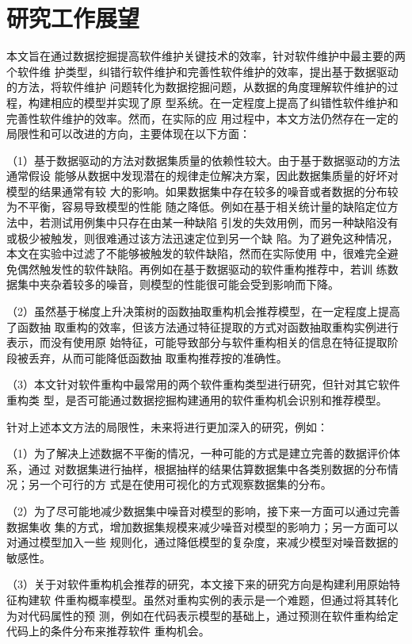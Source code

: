 \section{研究工作展望}
本文旨在通过数据挖掘提高软件维护关键技术的效率，针对软件维护中最主要的两个软件维
护类型，纠错行软件维护和完善性软件维护的效率，提出基于数据驱动的方法，将软件维护
问题转化为数据挖掘问题，从数据的角度理解软件维护的过程，构建相应的模型并实现了原
型系统。在一定程度上提高了纠错性软件维护和完善性软件维护的效率。然而，在实际的应
用过程中，本文方法仍然存在一定的局限性和可以改进的方向，主要体现在以下方面：

（1）基于数据驱动的方法对数据集质量的依赖性较大。由于基于数据驱动的方法通常假设
能够从数据中发现潜在的规律走位解决方案，因此数据集质量的好坏对模型的结果通常有较
大的影响。如果数据集中存在较多的噪音或者数据的分布较为不平衡，容易导致模型的性能
随之降低。例如在基于相关统计量的缺陷定位方法中，若测试用例集中只存在由某一种缺陷
引发的失效用例，而另一种缺陷没有或极少被触发，则很难通过该方法迅速定位到另一个缺
陷。为了避免这种情况，本文在实验中过滤了不能够被触发的软件缺陷，然而在实际使用
中，很难完全避免偶然触发性的软件缺陷。再例如在基于数据驱动的软件重构推荐中，若训
练数据集中夹杂着较多的噪音，则模型的性能很可能会受到影响而下降。


（2）虽然基于梯度上升决策树的函数抽取重构机会推荐模型，在一定程度上提高了函数抽
取重构的效率，但该方法通过特征提取的方式对函数抽取重构实例进行表示，而没有使用原
始特征，可能导致部分与软件重构相关的信息在特征提取阶段被丢弃，从而可能降低函数抽
取重构推荐按的准确性。

（3）本文针对软件重构中最常用的两个软件重构类型进行研究，但针对其它软件重构类
型，是否可能通过数据挖掘构建通用的软件重构机会识别和推荐模型。

针对上述本文方法的局限性，未来将进行更加深入的研究，例如：

（1）为了解决上述数据不平衡的情况，一种可能的方式是建立完善的数据评价体系，通过
对数据集进行抽样，根据抽样的结果估算数据集中各类别数据的分布情况；另一个可行的方
式是在使用可视化的方式观察数据集的分布。

（2）为了尽可能地减少数据集中噪音对模型的影响，接下来一方面可以通过完善数据集收
集的方式，增加数据集规模来减少噪音对模型的影响力；另一方面可以对通过模型加入一些
规则化，通过降低模型的复杂度，来减少模型对噪音数据的敏感性。

（3）关于对软件重构机会推荐的研究，本文接下来的研究方向是构建利用原始特征构建软
件重构概率模型。虽然对重构实例的表示是一个难题，但通过将其转化为对代码属性的预
测，例如在代码表示模型的基础上，通过预测在软件重构给定代码上的条件分布来推荐软件
重构机会。

